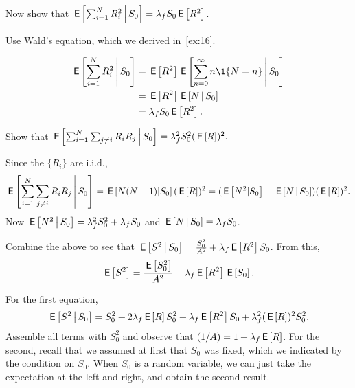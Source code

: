 \begin{extra}
 Now show that $\,\mathsf{E}\left[\sum_{i=1}^N R_i^2\,\middle|\, S_0\right] = \lambda_f S_0 \,\mathsf{E}\left[R^2\right]$.
\begin{hint}
 Use Wald's equation, which we derived in~\cref{ex:16}.
\end{hint}
\begin{solution}
 \begin{align*}
 \E{\sum_{i=1}^N R_i^2\given S_0} 
&= \E{R^2}\E{ \sum_{n=0}^\infty n \1{N=n}\given S_0}\\
&= \E{R^2} \E{N\given S_0} \\
&= \lambda_f S_0 \E{R^2}.
 \end{align*}
\end{solution}
\end{extra}

\begin{extra}
Show that 
$\,\mathsf{E}\left[\sum_{i=1}^N \sum_{j\neq i} R_i R_j\,\middle|\, S_0\right] = \lambda_f^2 S_0^2 (\,\mathsf{E}\left[R\right])^2.$
\begin{solution}
Since the $\{R_i\}$ are i.i.d., 
 \begin{equation*}
\,\mathsf{E}\left[\sum_{i=1}^N \sum_{j\neq i} R_i R_j\,\middle|\, S_0\right]
= \,\mathsf{E}\left[N(N-1)|S_0\right] (\,\mathsf{E}\left[R\right])^2 
= (\,\mathsf{E}\left[N^2|S_0\right]-\,\mathsf{E}\left[N\,\middle|\, S_0\right]) (\,\mathsf{E}\left[R\right])^2.
 \end{equation*}
Now $\,\mathsf{E}\left[N^2\,\middle|\, S_0\right]=\lambda_f^2 S_0^2 +\lambda_f S_0$ and $\,\mathsf{E}\left[N\,\middle|\, S_0\right] = \lambda_f S_0$.
\end{solution}
\end{extra}

\begin{extra}
 Combine the above to see that
 $\,\mathsf{E}\left[S^2\,\middle|\, S_0\right] = \frac{S_0^2}{A^2} + \lambda_f \,\mathsf{E}\left[R^2\right] S_0$. From this, 
 \begin{equation*}
 \,\mathsf{E}\left[S^2\right] = \frac{\,\mathsf{E}\left[S_0^2\right]}{A^2} + \lambda_f \,\mathsf{E}\left[R^2\right] \,\mathsf{E}\left[S_0\right].
 \end{equation*}
\begin{solution}
For the first equation,
\begin{equation*}
 \,\mathsf{E}\left[S^2\,\middle|\, S_0\right] = S_0^2 + 2\lambda_f \,\mathsf{E}\left[R\right] S_0^2 + \lambda_f \,\mathsf{E}\left[R^2\right] S_0 + \lambda_f^2 (\,\mathsf{E}\left[R\right])^2 S_0^2.
\end{equation*}
Assemble all terms with $S_0^2$ and observe that $(1/A) = 1+\lambda_f \,\mathsf{E}\left[R\right]$. For the second, recall that we assumed at first that $S_0$ was fixed, which we indicated by the condition on $S_0$. When $S_0$ is a random variable, we can just take the expectation at the left and right, and obtain the second result. 
\end{solution}
\end{extra}


